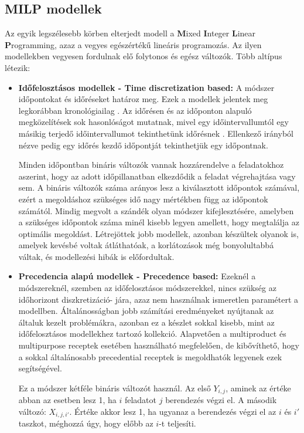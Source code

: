 \subsection{MILP modellek}
Az egyik legszélesebb körben elterjedt modell a \textbf{M}ixed \textbf{I}nteger \textbf{L}inear \textbf{P}rogramming, azaz a vegyes egészértékű lineáris programozás. Az ilyen modellekben vegyesen fordulnak elő folytonos és egész változók. Több altípus létezik:
\begin{itemize}
  \item[] \textbf{Időfelosztásos modellek - Time discretization based:} A módszer időpontokat és időréseket határoz meg. Ezek a modellek jelentek meg legkorábban kronológiailag \cite{kondili}. Az időrésen és az időponton alapuló megközelítések sok hasonlóságot mutatnak, mivel egy időintervallumtól egy másikig terjedő időintervallumot tekinthetünk időrésnek \cite{susarla}. Ellenkező irányból nézve pedig egy időrés kezdő időpontját tekinthetjük egy időpontnak.  
  
Minden időpontban bináris változók vannak hozzárendelve a feladatokhoz aszerint, hogy az adott időpillanatban elkezdődik a feladat végrehajtása vagy sem. A bináris változók száma arányos lesz a kiválasztott időpontok számával, ezért a megoldáshoz szükséges idő nagy mértékben függ az időpontok számától. Mindig megvolt a szándék olyan módszer kifejlesztésére, amelyben a szükséges időpontok száma minél kisebb legyen amellett, hogy megtalálja az optimális megoldást. Létrejöttek jobb modellek, azonban készültek olyanok is, amelyek kevésbé voltak átláthatóak, a korlátozások még bonyolultabbá váltak, és modellezési hibák is előfordultak.
  
  \item[] \textbf{Precedencia alapú modellek - Precedence based:} Ezeknél a módszereknél, szemben az időfelosztásos módszerekkel, nincs szükség az időhorizont diszkretizáció- jára, azaz nem használnak ismeretlen paramétert a modellben. Általánosságban jobb számítási eredményeket nyújtanak az általuk kezelt problémákra, azonban ez a készlet sokkal kisebb, mint az időfelosztásos modellekhez tartozó kollekció. Alapvetően a multiproduct és multipurpose receptek esetében használható megfelelően, de kibővíthető, hogy a sokkal általánosabb precedential receptek is megoldhatók legyenek ezek segítségével. 
  
Ez a módszer kétféle bináris változót használ. Az első $Y_{i,j}$, aminek az értéke abban az esetben lesz 1, ha $i$ feladatot $j$ berendezés végzi el. A második változó: $X_{i,j,i'}$. Értéke akkor lesz 1, ha ugyanaz a berendezés végzi el az $i$ és $i'$ taszkot, méghozzá úgy, hogy előbb az $i$-t teljesíti. 
\end{itemize}

